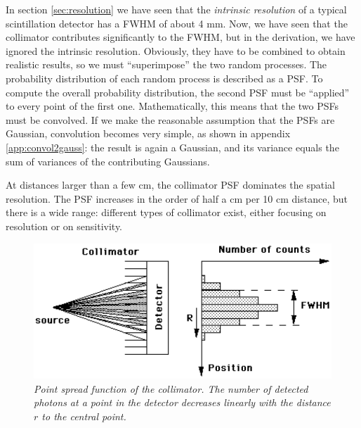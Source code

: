 In section \ref{sec:resolution} we have seen that the {\em intrinsic
resolution} of a typical scintillation detector has a FWHM of about 4 mm. Now,
we have seen that the collimator contributes significantly to the FWHM, but in
the derivation, we have ignored the intrinsic resolution.  Obviously, they
have to be combined to obtain realistic results, so we must ``superimpose'' the
two random processes. The probability distribution of each random process is
described as a PSF. To compute the overall probability distribution, the
second PSF must be ``applied'' to every point of the first
one. Mathematically, this means that the two PSFs must be convolved. If we
make the reasonable assumption that the PSFs are Gaussian, convolution
becomes very simple, as shown in appendix \ref{app:convol2gauss}: the result
is again a Gaussian, and its variance equals the sum of variances of the
contributing Gaussians.

At distances larger than a few cm, the collimator PSF dominates the spatial
resolution. The PSF increases in the order of half a cm per 10 cm distance,
but there is a wide range: different types of collimator exist, either
focusing on resolution or on sensitivity.

%
\begin{figure}[tb]
\centering
\includegraphics[width=\figone]{figs/fig_collimatorpsf.pdf}
\caption{\label{fig:collimatorpsf} \emph{Point spread function of
          the collimator. The number of detected photons at a point in the
          detector decreases linearly with the distance $r$ to the central
          point.}}
\end{figure}

